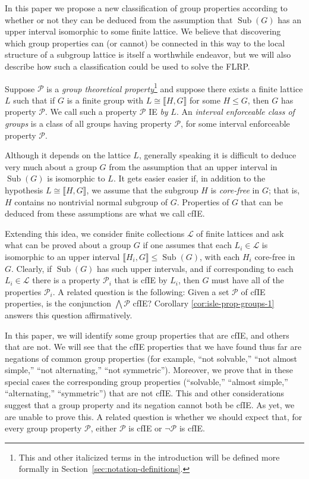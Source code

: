 \documentclass{gen-j-l}
\newcommand{\lb}{\ensuremath{\llbracket}}
\newcommand{\rb}{\ensuremath{\rrbracket}}
\newcommand{\<}{\ensuremath{\langle}}
\renewcommand{\>}{\ensuremath{\rangle}}
\theoremstyle{plain}
\theoremstyle{definition}
\theoremstyle{remark}
\numberwithin{theorem}{section}
\numberwithin{claim}{section}
\numberwithin{equation}{section}
\numberwithin{conjecture}{section}
\newcommand{\defn}[1]{\emph{#1}}
\renewcommand{\leq}{\ensuremath{\leqslant}}
\newcommand{\Meet}{\ensuremath{\bigwedge}}
\newcommand{\Sub}{\ensuremath{\operatorname{Sub}}}
\newcommand{\2}{\ensuremath{\mathbf{2}}}
\newcommand{\3}{\ensuremath{\mathbf{3}}}
\newcommand{\sL}{\ensuremath{\mathscr{L}}}
\newcommand{\sP}{\ensuremath{\mathscr{P}}}
\newcommand{\cP}{\ensuremath{\mathcal{P}}}
\newcommand{\IE}{{\small IE}}
\begin{document}
In this paper we propose a new classification of group properties according to
whether or not they can be deduced from the assumption that $\Sub(G)$ has an upper
interval isomorphic to some finite lattice.  We believe that discovering which 
group properties can (or cannot) be connected in this way to the local structure
of a subgroup lattice is itself a worthwhile endeavor, but we will also describe how
such a classification could be used to solve the \acs{FLRP}.  

Suppose $\cP$ is a \emph{group theoretical property}\footnote{This and other
  italicized terms in the introduction will be defined more formally in
  Section~\ref{sec:notation-definitions}.}  
and suppose there exists a finite lattice $L$ such that if $G$ is a finite group
with $L \cong \lb H,G \rb$ for some $H\leq G$, then $G$ has property $\cP$.  We call
such a property $\cP$ \ac{IE} \emph{by} $L$.
An \defn{interval enforceable class of groups} is a class of all groups having
property $\cP$, for some interval enforceable property $\cP$.

Although it depends on the lattice $L$, generally speaking it is difficult to 
deduce very much about a group $G$ from the assumption that an upper interval
in $\Sub(G)$ is isomorphic to $L$.  It gets easier easier if, in addition to the
hypothesis $L\cong\lb H,G \rb$, we assume that the subgroup $H$ is
\emph{core-free} in $G$; that is, $H$ contains no nontrivial normal subgroup of
$G$.  Properties of $G$ that can be deduced from these assumptions are what we
call \ac{cfIE}. 

Extending this idea, we consider finite collections $\sL$ of finite lattices
and ask what can be proved about a group $G$ if one assumes that each 
$L_i\in \sL$ is isomorphic to an upper interval $\lb H_i, G \rb\leq \Sub(G)$, with
each $H_i$ core-free in $G$.  Clearly, if $\Sub(G)$ has such upper intervals,
and if corresponding to each $L_i\in \sL$ there is a property
$\cP_i$ that is \ac{cfIE} by $L_i$, then $G$ must have all of the properties
$\cP_i$. A related question is the following: Given a set $\sP$ of
\ac{cfIE} properties, is the conjunction $\Meet \sP$ \ac{cfIE}?  
Corollary \ref{cor:isle-prop-groups-1} answers this question affirmatively. 

In this paper, we will identify some group properties that are \ac{cfIE}, and
others that are not. We will see that the \ac{cfIE} properties
that we have found thus far are negations of common group properties (for
example, ``not solvable,'' ``not almost simple,'' ``not alternating,'' ``not
symmetric'').  Moreover, we prove that in these special cases the
corresponding group properties (``solvable,'' ``almost simple,''
``alternating,''  ``symmetric'') that are not \ac{cfIE}.  This and
other considerations suggest that a group property and its
negation cannot both be \ac{cfIE}.  As yet, we are unable to prove this.
A related question is whether we should expect that, for every group property
$\cP$, either $\cP$ is \ac{cfIE} or $\neg \cP$ is \ac{cfIE}. 
\end{document}
